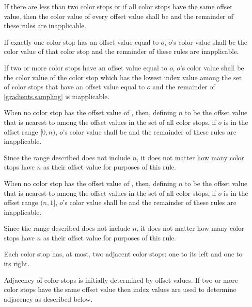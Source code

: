 \begin{enumeratea}
\item If there are less than two color stops or if all color stops have the same offset value, then the color value of every offset value shall be  and the remainder of these rules are inapplicable.

\item If exactly one color stop has an offset value equal to $o$, $o$'s color value shall be the color value of that color stop and the remainder of these rules are inapplicable.

\item If two or more color stops have an offset value equal to $o$, $o$'s color value shall be the color value of the color stop which has the lowest index value among the set of color stops that have an offset value equal to $o$ and the remainder of \ref{gradients.sampling} is inapplicable.

\item When no color stop has the offset value of , then, defining $n$ to be the offset value that is nearest to  among the offset values in the set of all color stops, if $o$ is in the offset range $[0, n)$, $o$'s color value shall be  and the remainder of these rules are inapplicable.
\begin{note}
Since the range described does not include $n$, it does not matter how many color stops have $n$ as their offset value for purposes of this rule.
\end{note}

\item When no color stop has the offset value of , then, defining $n$ to be the offset value that is nearest to  among the offset values in the set of all color stops, if $o$ is in the offset range $(n, 1]$, $o$'s color value shall be  and the remainder of these rules are inapplicable.
\begin{note}
Since the range described does not include $n$, it does not matter how many color stops have $n$ as their offset value for purposes of this rule.
\end{note}

\item Each color stop has, at most, two adjacent color stops: one to its left and one to its right.

\item Adjacency of color stops is initially determined by offset values. If two or more color stops have the same offset value then index values are used to determine adjacency as described below.


\end{enumeratea}
